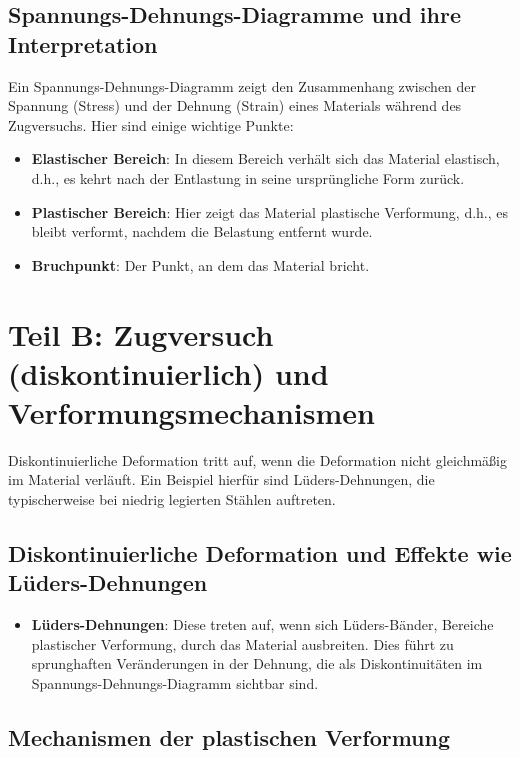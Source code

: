 \documentclass[a4paper,12pt]{article}
\begin{document}
\subsection{Spannungs-Dehnungs-Diagramme und ihre Interpretation}

Ein Spannungs-Dehnungs-Diagramm zeigt den Zusammenhang zwischen der Spannung (Stress) und der Dehnung (Strain) eines Materials während des Zugversuchs. Hier sind einige wichtige Punkte:

\begin{itemize}
    \item \textbf{Elastischer Bereich}: In diesem Bereich verhält sich das Material elastisch, d.h., es kehrt nach der Entlastung in seine ursprüngliche Form zurück.
    \item \textbf{Plastischer Bereich}: Hier zeigt das Material plastische Verformung, d.h., es bleibt verformt, nachdem die Belastung entfernt wurde.
    \item \textbf{Bruchpunkt}: Der Punkt, an dem das Material bricht.
\end{itemize}

\newpage

\section{Teil B: Zugversuch (diskontinuierlich) und Verformungsmechanismen}

Diskontinuierliche Deformation tritt auf, wenn die Deformation nicht gleichmäßig im Material verläuft. Ein Beispiel hierfür sind Lüders-Dehnungen, die typischerweise bei niedrig legierten Stählen auftreten.

\subsection{Diskontinuierliche Deformation und Effekte wie Lüders-Dehnungen}

\begin{itemize}
    \item \textbf{Lüders-Dehnungen}: Diese treten auf, wenn sich Lüders-Bänder, Bereiche plastischer Verformung, durch das Material ausbreiten. Dies führt zu sprunghaften Veränderungen in der Dehnung, die als Diskontinuitäten im Spannungs-Dehnungs-Diagramm sichtbar sind.
\end{itemize}

\subsection{Mechanismen der plastischen Verformung}
\end{document}
